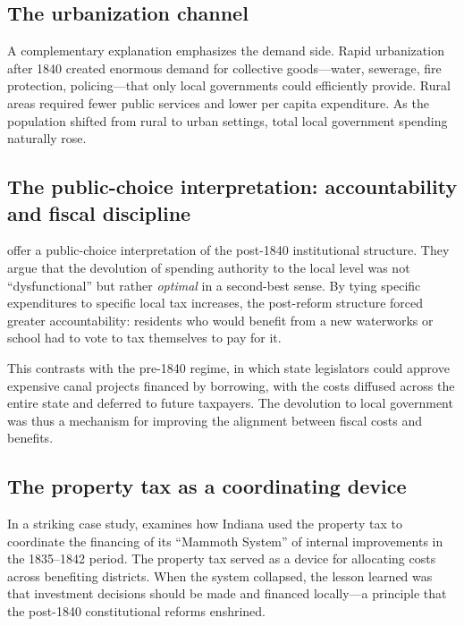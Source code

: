 \documentclass[12pt]{article}
\begin{document}
\subsection{The urbanization channel}

A complementary explanation emphasizes the demand side.  Rapid urbanization after 1840 created enormous demand for collective goods---water, sewerage, fire protection, policing---that only local governments could efficiently provide.  Rural areas required fewer public services and lower per capita expenditure.  As the population shifted from rural to urban settings, total local government spending naturally rose.

\subsection{The public-choice interpretation: accountability and fiscal discipline}

\citet{walliswein2008} offer a public-choice interpretation of the post-1840 institutional structure.  They argue that the devolution of spending authority to the local level was not ``dysfunctional'' but rather \textit{optimal} in a second-best sense.  By tying specific expenditures to specific local tax increases, the post-reform structure forced greater accountability: residents who would benefit from a new waterworks or school had to vote to tax themselves to pay for it.

This contrasts with the pre-1840 regime, in which state legislators could approve expensive canal projects financed by borrowing, with the costs diffused across the entire state and deferred to future taxpayers.  The devolution to local government was thus a mechanism for improving the alignment between fiscal costs and benefits.

\subsection{The property tax as a coordinating device}

In a striking case study, \citet{wallis2003indiana} examines how Indiana used the property tax to coordinate the financing of its ``Mammoth System'' of internal improvements in the 1835--1842 period.  The property tax served as a device for allocating costs across benefiting districts.  When the system collapsed, the lesson learned was that investment decisions should be made and financed locally---a principle that the post-1840 constitutional reforms enshrined.
\end{document}

